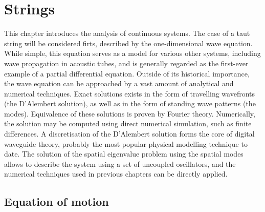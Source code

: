 \documentclass[11pt,twoside,a4paper,english]{book}
\begin{document}
\chapter{Strings}


This chapter introduces the analysis of continuous systems. The case of a taut string will be considered firts, described by the one-dimensional wave equation. While simple, this equation serves as a model for various other systems, including wave propagation in acoustic tubes, and is generally regarded as the first-ever example of a partial differential equation. Outside of its historical importance, the wave equation can be approached by a vast amount of analytical and numerical techniques. Exact solutions exists in the form of travelling wavefronts (the D'Alembert solution), as well as in the form of standing wave patterns (the modes). Equivalence of these solutions is proven by Fourier theory. Numerically, the solution may be computed using direct numerical simulation, such as finite differences. A discretisation of the D'Alembert solution forms the core of digital waveguide theory, probably the most popular physical modelling technique to date. The solution of the spatial eigenvalue problem using the spatial modes allows to describe the system using a set of uncoupled oscillators, and the numerical techniques used in previous chapters can be directly applied. 


\section{Equation of motion}
\end{document}
